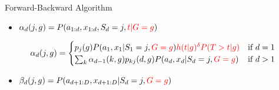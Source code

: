 \documentclass{beamer}
\begin{document}
\begin{frame}{Forward-Backward Algorithm }
\begin{itemize}
    \item $\alpha_{d}(j,g) = P(a_{1:d}, x_{1:d}, S_{d} = j, \mathcolor{red}{t|G=g})$
\end{itemize}

\[ \alpha_{d}(j,g) = \begin{cases}
    p_j(g)P(a_{1},x_1|S_{1}=j,\mathcolor{red}{G=g}) 
    \mathcolor{red}{h(t|g)^\delta P(T > t|g)}& \text{if } d = 1 \\
    \sum_{k} \alpha_{d-1}(k,g)p_{kj}(d,g)P(a_{d},x_d|S_{d}=j,\mathcolor{red}{G=g}) & \text{if } d > 1\\
\end{cases}\]
\bigskip
\begin{itemize}
    \item $\beta_{d}(j,g) =  P(a_{d+1:D}, x_{d+1:D} | S_{d} = j,\mathcolor{red}{G=g})$
\end{itemize}



\end{frame}



%
%
%
%    
%
%    
%
%    
%
\end{document}
